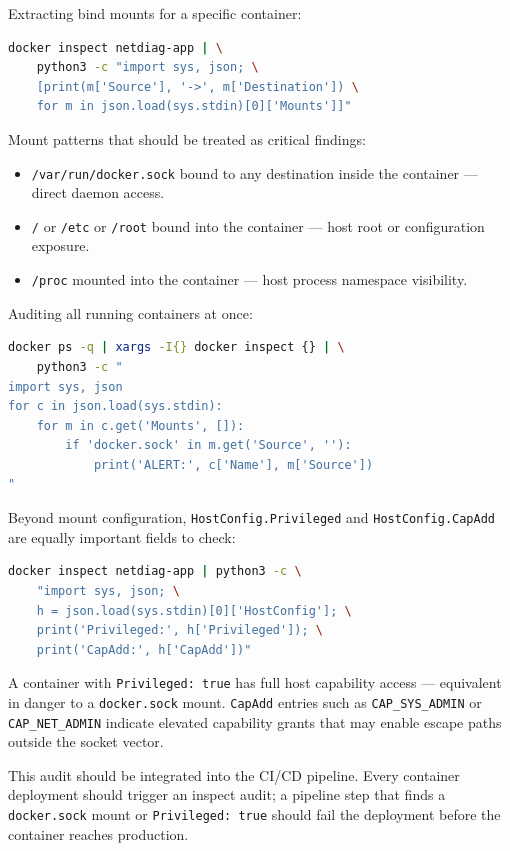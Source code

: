 Extracting bind mounts for a specific container:

\begin{lstlisting}[language=bash]
docker inspect netdiag-app | \
    python3 -c "import sys, json; \
    [print(m['Source'], '->', m['Destination']) \
    for m in json.load(sys.stdin)[0]['Mounts']]"
\end{lstlisting}

Mount patterns that should be treated as critical findings:
\begin{itemize}
    \item \texttt{/var/run/docker.sock} bound to any destination inside the container --- direct daemon access.
    \item \texttt{/} or \texttt{/etc} or \texttt{/root} bound into the container --- host root or configuration exposure.
    \item \texttt{/proc} mounted into the container --- host process namespace visibility.
\end{itemize}

Auditing all running containers at once:

\begin{lstlisting}[language=bash]
docker ps -q | xargs -I{} docker inspect {} | \
    python3 -c "
import sys, json
for c in json.load(sys.stdin):
    for m in c.get('Mounts', []):
        if 'docker.sock' in m.get('Source', ''):
            print('ALERT:', c['Name'], m['Source'])
"
\end{lstlisting}

Beyond mount configuration, \texttt{HostConfig.Privileged} and \texttt{HostConfig.CapAdd} are equally important fields to check:

\begin{lstlisting}[language=bash]
docker inspect netdiag-app | python3 -c \
    "import sys, json; \
    h = json.load(sys.stdin)[0]['HostConfig']; \
    print('Privileged:', h['Privileged']); \
    print('CapAdd:', h['CapAdd'])"
\end{lstlisting}

A container with \texttt{Privileged: true} has full host capability access --- equivalent in danger to a \texttt{docker.sock} mount. \texttt{CapAdd} entries such as \texttt{CAP\_SYS\_ADMIN} or \texttt{CAP\_NET\_ADMIN} indicate elevated capability grants that may enable escape paths outside the socket vector.

This audit should be integrated into the CI/CD pipeline. Every container deployment should trigger an inspect audit; a pipeline step that finds a \texttt{docker.sock} mount or \texttt{Privileged: true} should fail the deployment before the container reaches production.

